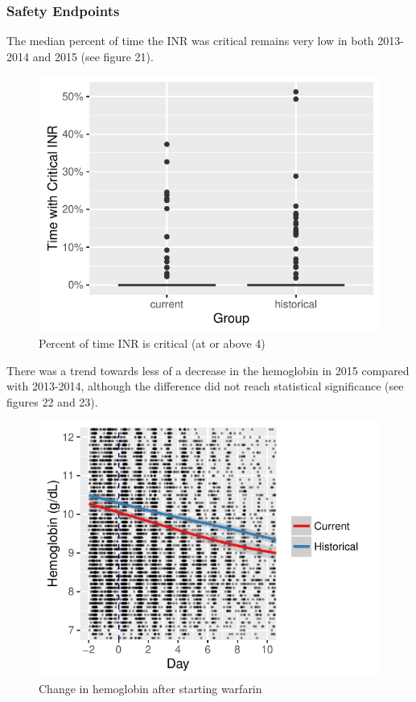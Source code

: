 \documentclass[]{article}
\begin{document}
\subsubsection{Safety Endpoints}\label{safety-endpoints-1}

The median percent of time the INR was critical remains very low in both
2013-2014 and 2015 (see figure 21).

\begin{figure}[H]
\centering
\includegraphics{warfarin_analysis_2015_files/figure-latex/critical_hist-1.pdf}
\caption{Percent of time INR is critical (at or above 4)}
\end{figure}

There was a trend towards less of a decrease in the hemoglobin in 2015
compared with 2013-2014, although the difference did not reach
statistical significance (see figures 22 and 23).

\begin{figure}[H]
\centering
\includegraphics{warfarin_analysis_2015_files/figure-latex/hgb_hist-1.pdf}
\caption{Change in hemoglobin after starting warfarin}
\end{figure}
\end{document}
